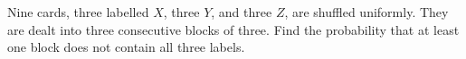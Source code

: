 Nine cards, three labelled $X$, three $Y$, and three $Z$, are shuffled uniformly. They are dealt into three consecutive blocks of three. Find the probability that at least one block does not contain all three labels.
